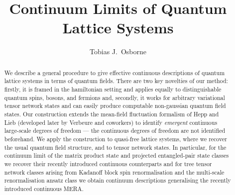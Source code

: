 \documentclass[prl,twocolumn,lengthcheck,superscriptaddress]{revtex4-1}
\theoremstyle{definition}
\theoremstyle{remark}
\begin{document}
\title{Continuum Limits of Quantum Lattice Systems}

\author{Tobias J.\ Osborne}

\begin{abstract}
	We describe a general procedure to give effective continuous descriptions of quantum lattice systems in terms of quantum fields. There are two key novelties of our method: firstly, it is framed in the hamiltonian setting and applies equally to distinguishable quantum spins, bosons, and fermions and, secondly, it works for arbitrary variational tensor network states and can easily produce computable non-gaussian quantum field states. Our construction extends the mean-field fluctuation formalism of Hepp and Lieb (developed later by Verbeure and coworkers) to identify \emph{emergent} continuous large-scale degrees of freedom --- the continuous degrees of freedom are not identified beforehand. We apply the construction to quasi-free lattice systems, where we recover the usual quantum field structure, and to tensor network states. In particular, for the continuum limit of the matrix product state and projected entangled-pair state classes we recover their recently introduced continuous counterparts and for tree tensor network classes arising from Kadanoff block spin renormalisation and the multi-scale renormalisation ansatz class we obtain continuum descriptions generalising the recently introduced continuous MERA.
\end{abstract}

\maketitle
\end{document}
